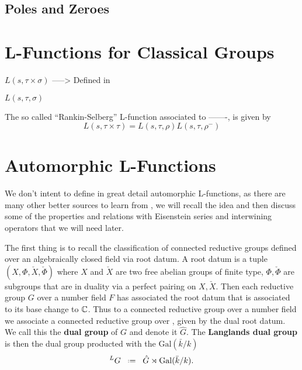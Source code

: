 \subsection{Poles and Zeroes}


\section{L-Functions for Classical Groups}

\(L(s, \tau\times \sigma)\)
\cite{remarks on rankin selberg convolutions Cogdel and PT-shapiro}\cite{cogdellFunctorialityClassicalGroups2004} -----> Defined in \cite{shahidiProofLanglandsConjecture1990}

\(L(s, \tau, \sigma)\)
\cite{grbacResidualSpectrumSplit2011}

\begin{example}[]
	The so called ``Rankin-Selberg'' L-function associated to -------, is given by 
	\[L(s, \tau\times \tau) = L(s, \tau, \rho)L(s, \tau, \rho^-)\]	
\end{example}

\section{Automorphic L-Functions}
We don't intent to define in great detail automorphic L-functions, as there are many other better sources to learn from \cite[Part 2.III.2]{borelAutomorphicFormsRepresentations1979}\cite{shahidiEisensteinSeriesAutomorphic2010}\cite{cogdellLFUNCTIONSFUNCTORIALITY}\cite[9, 10, 11]{bumpIntroductionLanglandsProgram2004}\cite{arthurLfunctionsAutomorphicRepresenta}, we will recall the idea and then discuss some of the properties and relations with Eisenstein series and interwining operators that we will need later.

The first thing is to recall the classification of connected reductive groups defined over an algebraically closed field via root datum. A root datum is a tuple \((X, \Phi, \check{X} , \check{\Phi})\) where \(X\) and \(\check{X}\) are two free abelian groups of finite type, \(\Phi, \check{\Phi}\) are subgroups that are in duality via a perfect pairing on \(X, \check{X}\). Then each reductive group \(G\) over a number field \(F\) has associated the root datum that is associated to its base change to \(\C\). Thus to a connected reductive group over a number field we associate a connected reductive group over \C, given by the dual root datum. We call this the \textbf{dual group} of \(G\) and denote it \(\hat{G}\). The \textbf{Langlands dual group} is then the dual group producted with the \(\mathrm{Gal}(\bar{k}/k)\)
\[^L G \defeq \hat{G} \rtimes \mathrm{Gal}(\bar{k}/k).\]

